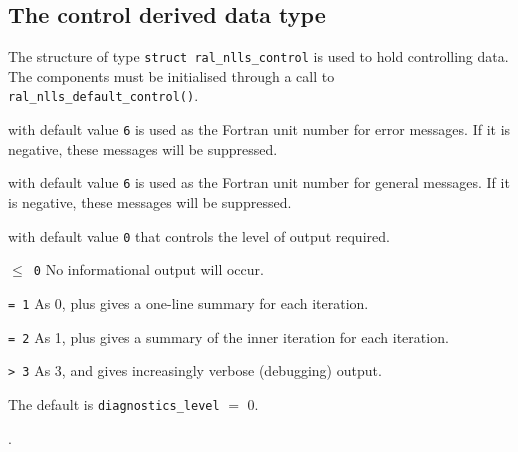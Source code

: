 \documentclass{spec}
\begin{document}
\subsection{The control derived data type}
\label{typecontrol} 

The structure of type {\tt struct ral\_nlls\_control} is used to hold
controlling data. The components must be initialised through a call to
\texttt{ral\_nlls\_default\_control()}.

\vspace{2mm}

\begin{description}

 with default value {\tt 6}
is used as the Fortran unit number for error messages. If it is negative, these
messages will be suppressed.  

 with default value {\tt 6}
is used as the Fortran unit number for general messages. If it is negative, these messages will be suppressed. 

 with default value {\tt 0} that 
controls the level of output required. 
\begin{description} 
\item{\tt $\leq$ 0} No informational output will occur.
\item{\tt = 1} As 0, plus gives a one-line summary for each iteration.
\item{\tt = 2} As 1, plus gives a summary of the inner iteration for each iteration.
\item{\tt > 3} As 3, and gives increasingly verbose (debugging) output.
\end{description}
The default is {\tt diagnostics\_level} $=$ 0.
\end{description}

.
\end{document}
